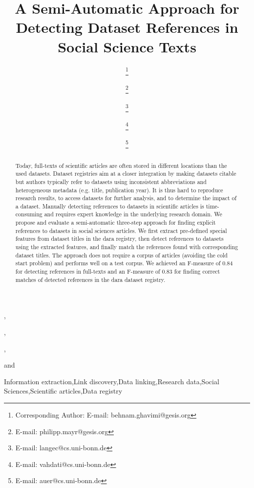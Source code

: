 \documentclass{IOS-Book-Article}
\newcommand{\dara}{\textsf{da\textbar ra}}
\begin{document}
\pagestyle{headings}
\def\thepage{}

\begin{frontmatter}
\title{A Semi-Automatic Approach for Detecting Dataset References in Social Science Texts}
\author[A,B]{ 
\thanks{Corresponding Author: E-mail: behnam.ghavimi@gesis.org}},
\author[A]{ 
\thanks{E-mail: philipp.mayr@gesis.org}},
\author[B,C]{  
\thanks{E-mail: langec@cs.uni-bonn.de}},
\author[B]{ 
\thanks{E-mail: vahdati@cs.uni-bonn.de}}
and
\author[B,C]{  
\thanks{E-mail: auer@cs.uni-bonn.de}}

\address[A]{GESIS – Leibniz Institute for the Social Sciences}
\address[B]{Enterprise Information Systems (EIS), University of Bonn}
\address[C]{Fraunhofer Institute for Intelligent Analysis and Information Systems IAIS}
\begin{abstract}
Today, full-texts of scientific articles are often stored in different locations than the used datasets.
Dataset registries aim at a closer integration by making datasets citable 
but authors typically refer to datasets using inconsistent abbreviations and heterogeneous metadata (e.g. title, publication year).
It is thus hard to reproduce research results, to access datasets for further analysis, and to determine the impact of a dataset.
Manually detecting references to datasets in scientific articles is time-consuming and requires expert knowledge in the underlying research domain. 
We propose and evaluate a semi-automatic three-step approach for finding explicit references to datasets in social sciences articles.
We first extract pre-defined special features from dataset titles in the {\dara} registry, then detect references to datasets using the extracted features, and finally match the references found with corresponding dataset titles.
The approach does not require a corpus of articles (avoiding the cold start problem) and performs well on a test corpus. 
We achieved an F-measure of 0.84 for detecting references in full-texts and an F-measure of 0.83 for finding correct matches of detected references in the {\dara} dataset registry.

\end{abstract}

\begin{keyword}
Information extraction\sep Link discovery\sep Data linking\sep Research data\sep Social Sciences\sep Scientific articles\sep Data registry
\end{keyword}
\end{frontmatter}
\end{document}
